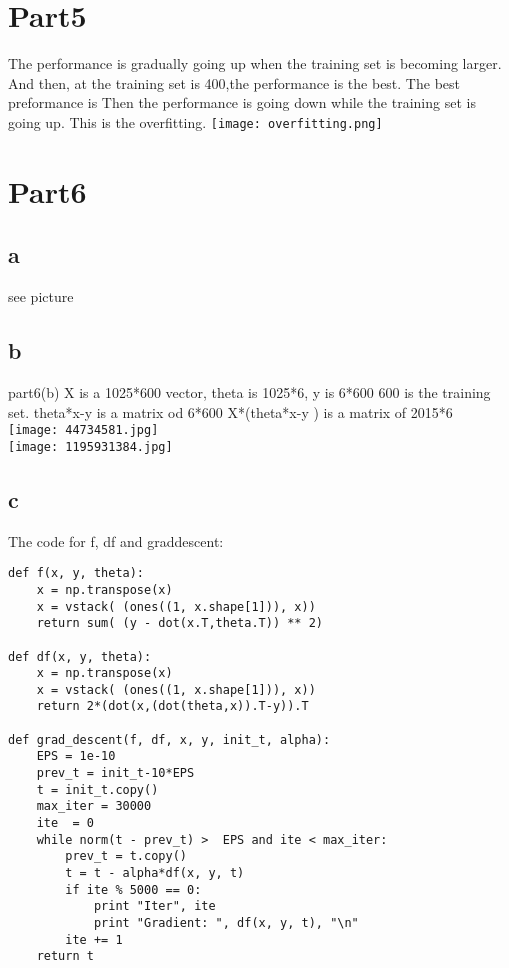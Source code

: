 \documentclass[12pt]{article}
\begin{document}
\section{Part5}
The performance is gradually going up when the training set is becoming larger. And then, at the training set is 400,the performance is the best. The best preformance is Then the performance is going down while the training set is going up. This is the overfitting.
\texttt{[image: overfitting.png]}\\

\section{Part6}
\subsection{a}
see picture
\subsection{b}
part6(b) X is a 1025*600 vector, theta is 1025*6, y is 6*600
600 is the training set.
theta*x-y is a matrix od 6*600
X*(theta*x-y ) is a matrix of 2015*6\\
\texttt{[image: 44734581.jpg]}\\
\texttt{[image: 1195931384.jpg]}\\

\subsection{c}


The code for f, df and  graddescent:
\begin{verbatim}
def f(x, y, theta):
    x = np.transpose(x)
    x = vstack( (ones((1, x.shape[1])), x))
    return sum( (y - dot(x.T,theta.T)) ** 2)

def df(x, y, theta):
    x = np.transpose(x)
    x = vstack( (ones((1, x.shape[1])), x))
    return 2*(dot(x,(dot(theta,x)).T-y)).T

def grad_descent(f, df, x, y, init_t, alpha):
    EPS = 1e-10   
    prev_t = init_t-10*EPS
    t = init_t.copy()
    max_iter = 30000
    ite  = 0
    while norm(t - prev_t) >  EPS and ite < max_iter:
        prev_t = t.copy()
        t = t - alpha*df(x, y, t)
        if ite % 5000 == 0:
            print "Iter", ite
            print "Gradient: ", df(x, y, t), "\n"
        ite += 1
    return t
\end{verbatim}
\end{document}
